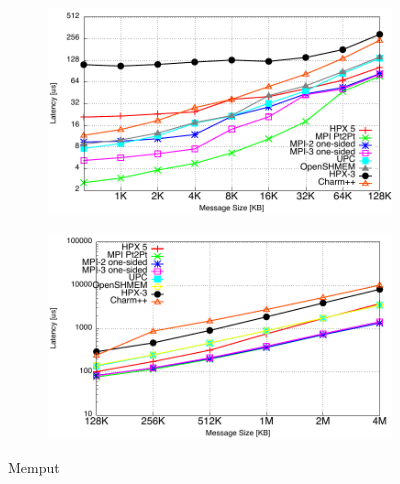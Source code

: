 \documentclass[10pt]{article}
\begin{document}
\begin{figure}[!ht]
\centering
\begin{subfigure}[b]{0.45\textwidth}
\includegraphics[width=\textwidth]{cutter/plots/put_latency_small}
\label{fig:put-small}
\end{subfigure}%
\begin{subfigure}[b]{0.45\textwidth}
\includegraphics[width=\textwidth]{cutter/plots/put_latency_large}
\label{fig:put-large}
\end{subfigure}%
\caption{Memput}
\label{fig:memput}
\end{figure}
\end{document}
